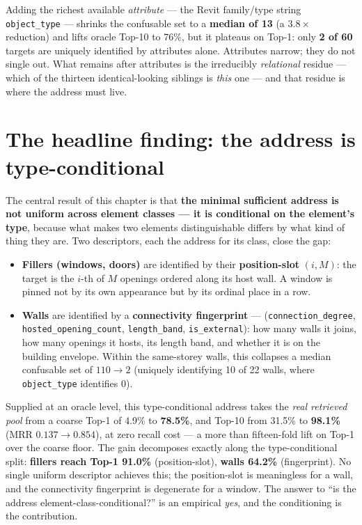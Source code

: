 Adding the richest available \emph{attribute} --- the Revit family/type string \texttt{object\_type}
--- shrinks the confusable set to a \textbf{median of 13} (a $3.8\times$ reduction) and lifts oracle
Top-10 to 76\%, but it plateaus on Top-1: only \textbf{2 of 60} targets are uniquely identified by
attributes alone. Attributes narrow; they do not single out. What remains after attributes is the
irreducibly \emph{relational} residue --- which of the thirteen identical-looking siblings is
\emph{this} one --- and that residue is where the address must live.

\section{The headline finding: the address is type-conditional}

The central result of this chapter is that \textbf{the minimal sufficient address is not uniform
across element classes --- it is conditional on the element's type}, because what makes two elements
distinguishable differs by what kind of thing they are. Two descriptors, each the address for its
class, close the gap:

\begin{itemize}
  \item \textbf{Fillers (windows, doors)} are identified by their \textbf{position-slot} $(i, M)$:
  the target is the $i$-th of $M$ openings ordered along its host wall. A window is pinned not by its
  own appearance but by its ordinal place in a row.
  \item \textbf{Walls} are identified by a \textbf{connectivity fingerprint} ---
  (\texttt{connection\_degree}, \texttt{hosted\_opening\_count}, \texttt{length\_band},
  \texttt{is\_external}): how many walls it joins, how many openings it hosts, its length band, and
  whether it is on the building envelope. Within the same-storey walls, this collapses a median
  confusable set of $110 \to 2$ (uniquely identifying 10 of 22 walls, where \texttt{object\_type}
  identifies 0).
\end{itemize}

Supplied at an oracle level, this type-conditional address takes the \emph{real retrieved pool} from
a coarse Top-1 of 4.9\% to \textbf{78.5\%}, and Top-10 from 31.5\% to \textbf{98.1\%} (MRR $0.137 \to
0.854$), at zero recall cost --- a more than fifteen-fold lift on Top-1 over the coarse floor. The
gain decomposes exactly along the type-conditional split: \textbf{fillers reach Top-1 91.0\%}
(position-slot), \textbf{walls 64.2\%} (fingerprint). No single uniform descriptor achieves this; the
position-slot is meaningless for a wall, and the connectivity fingerprint is degenerate for a window.
The answer to ``is the address element-class-conditional?'' is an empirical \emph{yes}, and the
conditioning is the contribution.

